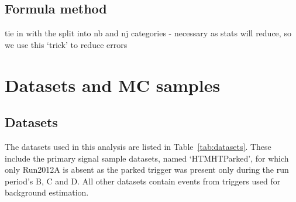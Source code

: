 \subsection{Formula method}

tie in with the split into nb and nj categories - necessary as stats will reduce, so we use
this `trick' to reduce errors



\section{Datasets and MC samples}

\subsection{Datasets}

The datasets used in this analysis are listed in Table~\ref{tab:datasets}. These
include the primary signal sample datasets, named `HTMHTParked', for which only
Run2012A is absent as the parked trigger was present only during the 
run period's B, C and D. All other datasets contain events from triggers used for 
background estimation.

